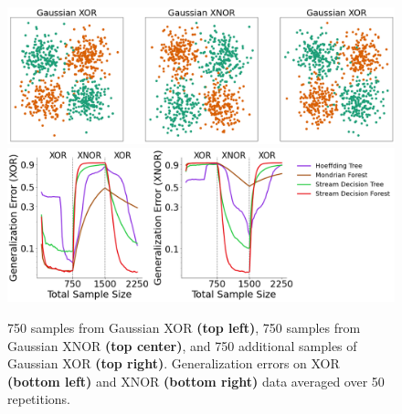 \begin{figure}[!htb]
  \centering
  \includegraphics[width=1.0\textwidth]{XOR_XNOR_data.png}
  \includegraphics[width=1.0\textwidth]{XOR_XNOR_results.png}
    \caption{750 samples from Gaussian XOR \textbf{(top left)}, 750 samples from Gaussian XNOR \textbf{(top center)}, and 750 additional samples of Gaussian XOR \textbf{(top right)}. Generalization errors on XOR \textbf{(bottom left)} and XNOR \textbf{(bottom right)} data averaged over 50 repetitions. 
  }
  \label{fig:xnor}
\end{figure}
